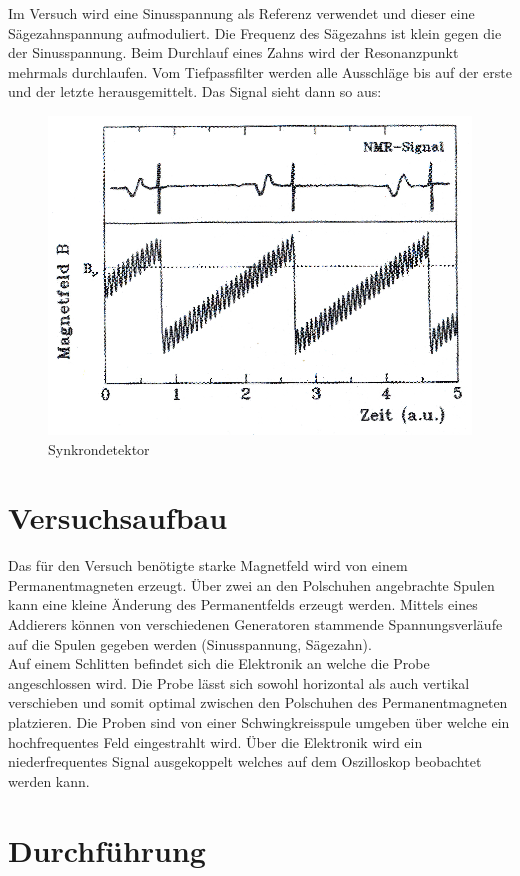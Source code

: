 \documentclass[12pt]{article}
\begin{document}
Im Versuch wird eine Sinusspannung als Referenz verwendet und dieser eine Sägezahnspannung aufmoduliert. Die Frequenz des Sägezahns ist klein gegen die der Sinusspannung. Beim Durchlauf eines Zahns wird der Resonanzpunkt mehrmals durchlaufen. Vom Tiefpassfilter werden alle Ausschläge bis auf der erste und der letzte herausgemittelt. Das Signal sieht dann so aus:
\begin{figure}[H]
\centering
\includegraphics[width=0.9\linewidth]{pictures/schemalockin.eps}
\caption{Synkrondetektor}
\end{figure}

\section{Versuchsaufbau}
Das für den Versuch benötigte starke Magnetfeld wird von einem Permanentmagneten erzeugt. Über zwei an den Polschuhen angebrachte Spulen kann eine kleine Änderung des Permanentfelds erzeugt werden. Mittels eines Addierers können von verschiedenen Generatoren stammende Spannungsverläufe auf die Spulen gegeben werden (Sinusspannung, Sägezahn).\\

Auf einem Schlitten befindet sich die Elektronik an welche die Probe angeschlossen wird. Die Probe lässt sich sowohl horizontal als auch vertikal verschieben und somit optimal zwischen den Polschuhen des Permanentmagneten platzieren.
Die Proben sind von einer Schwingkreisspule umgeben über welche ein hochfrequentes Feld eingestrahlt wird. Über die Elektronik wird ein niederfrequentes Signal ausgekoppelt welches auf dem Oszilloskop beobachtet werden kann.

\section{Durchführung}
\end{document}
